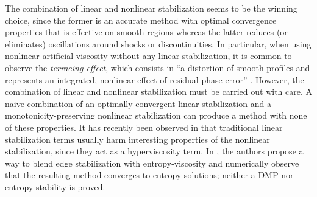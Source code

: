 
The combination of linear and nonlinear stabilization seems to be the winning choice, since the former is an accurate method with optimal convergence properties that is effective on smooth regions whereas the latter reduces (or eliminates) oscillations around shocks or discontinuities. In par\-ti\-cular, when using nonlinear artificial viscosity without any linear stabilization, it is common to observe the \emph{terracing effect}, which consists in ``a distortion of smooth profiles and represents an integrated, nonlinear effect of residual phase error'' \cite{kuzmin_flux-corrected_2005,oran_numerical_2005}. However, the combination of linear
and non\-li\-near stabilization must be carried out with care. A naive combination of an 
optimally convergent linear stabilization and a monotonicity-preserving nonlinear
stabilization can produce a method with none of these properties. It has recently been 
observed in \cite{ern_weighting_2012} that traditional linear stabilization terms usually harm interesting properties of the nonlinear stabilization, since they act as a hyperviscosity term. In \cite{ern_weighting_2012}, the authors propose a way to blend edge stabilization  \cite{burman_edge_2004} with entropy-viscosity and numerically observe that the resulting method converges to entropy
solutions; neither a DMP nor entropy stability is proved.


